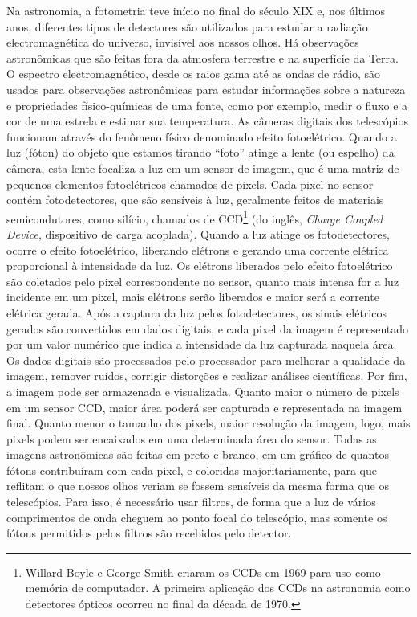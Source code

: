Na astronomia, a fotometria teve início no final do século XIX e, nos últimos anos, diferentes tipos de detectores são utilizados para estudar a radiação electromagnética do universo, invisível aos nossos olhos. Há observações astronômicas que são feitas fora da atmosfera terrestre e na superfície da Terra. O espectro electromagnético, desde os raios gama até as ondas de rádio, são usados para observações astronômicas para estudar informações sobre a natureza e propriedades físico-químicas de uma fonte, como por exemplo, medir o fluxo e a cor de uma estrela e estimar sua temperatura. As câmeras digitais dos telescópios funcionam através do fenômeno físico denominado efeito fotoelétrico. Quando a luz (fóton) do objeto que estamos tirando ``foto'' atinge a lente (ou espelho) da câmera, esta lente focaliza a luz em um sensor de imagem, que é uma matriz de pequenos elementos fotoelétricos chamados de pixels. Cada pixel no sensor contém fotodetectores, que são sensíveis à luz, geralmente feitos de materiais semicondutores, como silício, chamados de CCD\footnote{Willard Boyle e George Smith criaram os CCDs em 1969 para uso como memória de computador. A primeira aplicação dos CCDs na astronomia como detectores ópticos ocorreu no final da década de 1970.} (do inglês, \emph{Charge Coupled Device}, dispositivo de carga acoplada). Quando a luz atinge os fotodetectores, ocorre o efeito fotoelétrico, liberando elétrons e gerando uma corrente elétrica proporcional à intensidade da luz. Os elétrons liberados pelo efeito fotoelétrico são coletados pelo pixel correspondente no sensor, quanto mais intensa for a luz incidente em um pixel, mais elétrons serão liberados e maior será a corrente elétrica gerada. Após a captura da luz pelos fotodetectores, os sinais elétricos gerados são convertidos em dados digitais, e cada pixel da imagem é representado por um valor numérico que indica a intensidade da luz capturada naquela área. Os dados digitais são processados pelo processador para melhorar a qualidade da imagem, remover ruídos, corrigir distorções e realizar análises científicas. Por fim, a imagem pode ser armazenada e visualizada. Quanto maior o número de pixels em um sensor CCD, maior área poderá ser capturada e representada na imagem final. Quanto menor o tamanho dos pixels, maior resolução da imagem, logo, mais pixels podem ser encaixados em uma determinada área do sensor. Todas as imagens astronômicas são feitas em preto e branco, em um gráfico de quantos fótons contribuíram com cada pixel, e coloridas majoritariamente, para que reflitam o que nossos olhos veriam se fossem sensíveis da mesma forma que os telescópios. Para isso, é necessário usar filtros, de forma que a luz de vários comprimentos de onda cheguem ao ponto focal do telescópio, mas somente os fótons permitidos pelos filtros são recebidos pelo detector.

